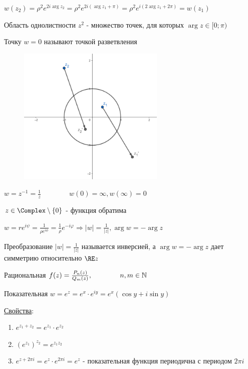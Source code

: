 \documentclass[12pt]{article}
\begin{document}
$w(z_2) = \rho^2 e^{2i\arg z_2} = \rho^2 e^{2i (\arg z_1 + \pi)} = \rho^2 e^{i (2\arg z_1 + 2\pi)} = w(z_1)$

Область однолистности $z^2$ - множество точек, для которых $\arg z \in [0; \pi)$

Точку $w = 0$ называют точкой разветвления


\begin{figure}
    \includegraphics[width=7cm]{addchapters2/images/addchapters2_2025_02_21_1}
\end{figure}

\Exs $w = z^{-1} = \frac{1}{z} \qquad\qquad w(0) = \infty, w(\infty) = 0$

$z \in \Complex \setminus \{0\}$ - функция обратима

$w = re^{i\psi} = \frac{1}{\rho e^{i\phi}} = \frac{1}{\rho} e^{-i\varphi} \Longrightarrow |w| = \frac{1}{|z|}, \arg w = -\arg z$

Преобразование $|w| = \frac{1}{|z|}$ называется инверсией, а $\arg w = -\arg z$ дает симметрию относительно $\RE z$

 Рациональная $f(z) = \frac{P_n(z)}{Q_m(z)}, \qquad\qquad n, m \in \mathbb{N}$

 Показательная $w = e^z = e^x \cdot e^{iy} = e^x (\cos y + i \sin y)$

\underline{Свойства}: 

\begin{enumerate}
    \item $e^{z_1 + z_2} = e^{z_1} \cdot e^{z_2}$
    \item $\left(e^{z_1}\right)^{z_2} = e^{z_1 z_2}$
    \item $e^{z + 2\pi i} = e^{z} \cdot e^{2\pi i} = e^z$ - показательная функция периодична с периодом $2\pi i$
\end{enumerate}
\end{document}
